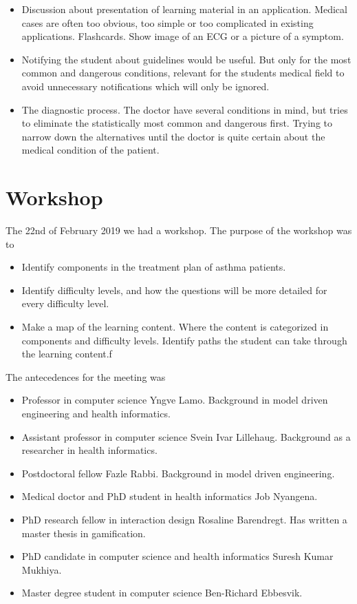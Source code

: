 \begin{itemize}
	\item Discussion about presentation of learning material in an application. Medical cases are often too obvious, too simple or too complicated in existing applications. Flashcards. Show image of an ECG or a picture of a symptom.
	\item Notifying the student about guidelines would be useful. But only for the most common and dangerous conditions, relevant for the students medical field to avoid unnecessary notifications which will only be ignored.
\item The diagnostic process. The doctor have several conditions in mind, but tries to eliminate the statistically most common and dangerous first. Trying to narrow down the alternatives until the doctor is quite certain about the medical condition of the patient.
	
\end{itemize}


\section{Workshop}
The 22nd of February 2019 we had a workshop. The purpose of the workshop was to
\begin{itemize}
	\item Identify components in the treatment plan of asthma patients.
	\item Identify difficulty levels, and how the questions will be more detailed for every difficulty level.
	\item Make a map of the learning content. Where the content is categorized in components and difficulty levels.  Identify paths the student can take through the learning content.f 
\end{itemize}

The antecedences for the meeting was 
\begin{itemize}
	\item Professor in computer science Yngve Lamo. Background in model driven engineering and health informatics.
	\item Assistant professor in computer science Svein Ivar Lillehaug. Background as a researcher in health informatics.
	\item Postdoctoral fellow Fazle Rabbi. Background in model driven engineering.
	\item Medical doctor and PhD student in health informatics Job Nyangena.
	\item PhD research fellow in interaction design Rosaline Barendregt. Has written a master thesis in gamification.
	\item PhD candidate in computer science and health informatics Suresh Kumar Mukhiya.
	\item Master degree student in computer science Ben-Richard Ebbesvik.	
\end{itemize}

